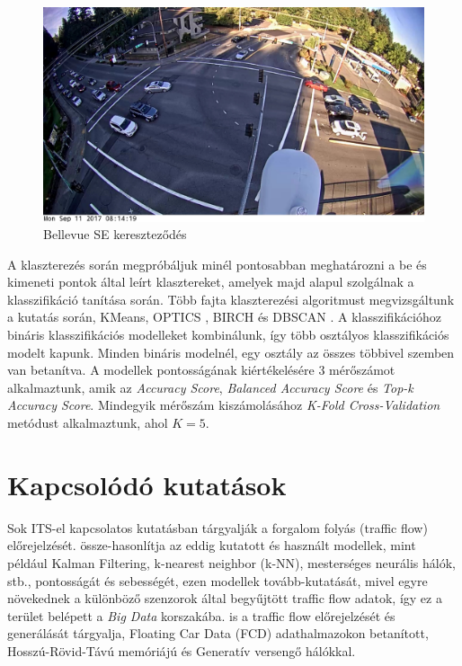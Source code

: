 \documentclass[acmtog, authorversion]{acmart}
\begin{document}
\begin{figure}
    \includegraphics[width=1\columnwidth]{dataset_samples/Bellevue_150th_SE38th.JPG}
    \caption{Bellevue SE kereszteződés}
    \label{fig: BellevueSE}
\end{figure}
A klaszterezés során megpróbáljuk minél pontosabban meghatározni a be és kimeneti pontok által leírt klasztereket, amelyek majd alapul szolgálnak a
klasszifikáció tanítása során. Több fajta klaszterezési algoritmust megvizsgáltunk a kutatás során, KMeans, OPTICS \cite{10.1145/304181.304187}, BIRCH \cite{10.1145/233269.233324} és DBSCAN \cite{10.5555/3001460.3001507}\cite{10.1145/3068335}. 
A klasszifikációhoz bináris klasszifikációs modelleket kombinálunk, így több osztályos klasszifikációs modelt
kapunk. Minden bináris modelnél, egy osztály az összes többivel szemben van betanítva. A modellek pontosságának kiértékelésére 3 mérőszámot
alkalmaztunk, amik az \emph{Accuracy Score}, \emph{Balanced Accuracy Score} \cite{10.1109/ICPR.2010.764} és \emph{Top-k Accuracy Score}.
Mindegyik mérőszám kiszámolásához \emph{K-Fold Cross-Validation} \cite{Anguita2012TheI} metódust alkalmaztunk, ahol \begin{math}K=5\end{math}.

\section{Kapcsolódó kutatások}
Sok ITS-el kapcsolatos kutatásban tárgyalják a forgalom folyás (traffic flow) előrejelzését. \cite{PAUL2017177} össze-hasonlítja az eddig
kutatott és használt modellek, mint például Kalman Filtering, k-nearest neighbor (k-NN), mesterséges neurális hálók, stb., pontosságát és
sebességét, ezen modellek tovább-kutatását, mivel egyre növekednek a különböző szenzorok által  begyűjtött traffic flow adatok, így ez a terület belépett
a \emph{Big Data} korszakába. \cite{10.1371/journal.pone.0253868} is a traffic flow előrejelzését és generálását tárgyalja, Floating Car Data (FCD) 
adathalmazokon betanított, Hosszú-Rövid-Távú memóriájú és Generatív versengő hálókkal.
\end{document}

